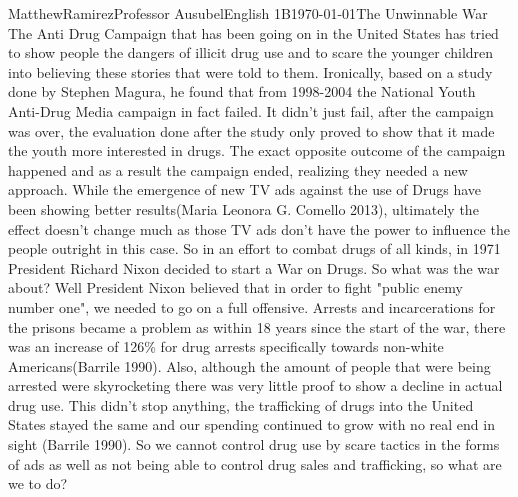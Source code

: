 \documentclass[12pt,letterpaper]{article}
\begin{document}
\begin{mla}{Matthew}{Ramirez}{Professor Ausubel}{English 1B}{\today}{The Unwinnable War}
The Anti Drug Campaign that has been going on in the United States has tried to show people the dangers of illicit drug use and to scare the younger children into believing these stories that were told to them. Ironically, based on a study done by Stephen Magura, he found that from 1998-2004 the National Youth Anti-Drug Media campaign in fact failed. It didn't just fail, after the campaign was over, the evaluation done after the study only proved to show that it made the youth more interested in drugs. The exact opposite outcome of the campaign happened and as a result the campaign ended, realizing they needed a new approach. While the emergence of new TV ads against the use of Drugs have been showing better results(Maria Leonora G. Comello 2013), ultimately the effect doesn't change much as those TV ads don't have the power to influence the people outright in this case. So in an effort to combat drugs of all kinds, in 1971 President Richard Nixon decided to start a War on Drugs. So what was the war about? Well President Nixon believed that in order to fight "public enemy number one", we needed to go on a full offensive. Arrests and incarcerations for the prisons became a problem as within 18 years since the start of the war, there was an increase of 126\% for drug arrests specifically towards non-white Americans(Barrile 1990). Also, although the amount of people that were being arrested were skyrocketing there was very little proof to show a decline in actual drug use. This didn't stop anything, the trafficking of drugs into the United States stayed the same and our spending continued to grow with no real end in sight (Barrile 1990). So we cannot control drug use by scare tactics in the forms of ads as well as not being able to control drug sales and trafficking, so what are we to do?\\
\label{What should we do? Pt.1 The War on Drugs}

\end{mla}
\end{document}

